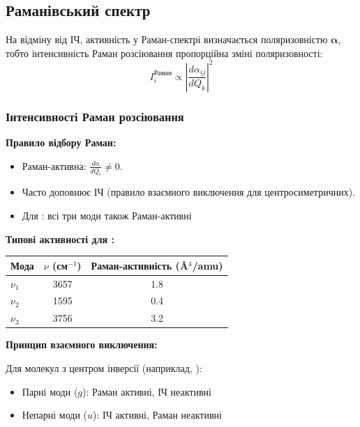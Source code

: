 {%
\subsection{Раманівський спектр}

На відміну від ІЧ, активність у Раман-спектрі визначається
поляризовністю $\boldsymbol{\alpha}$, тобто інтенсивність Раман розсіювання пропорційна зміні поляризовності:
\[
    I_i^{\text{Раман}} \propto \left|\frac{d\alpha_{ij}}{dQ_k}\right|^2
\]

\subsubsection{Інтенсивності Раман розсіювання}


\textbf{Правило відбору Раман:}
\begin{itemize}
    \item Раман-активна: $\frac{d\alpha}{dQ_i} \neq 0$.
    \item Часто доповнює ІЧ (правило взаємного виключення для центросиметричних).
    \item Для : всі три моди також Раман-активні
\end{itemize}


\textbf{Типові активності для :}
\begin{center}
    \begin{tabular}{lcc}
        \toprule
        Мода    & $\nu$ (см$^{-1}$) & Раман-активність (Å$^4$/amu) \\
        \midrule
        $\nu_1$ & 3657              & 1.8                          \\
        $\nu_2$ & 1595              & 0.4                          \\
        $\nu_3$ & 3756              & 3.2                          \\
        \bottomrule
    \end{tabular}
\end{center}


\textbf{Принцип взаємного виключення:}

Для молекул з центром інверсії (наприклад, ):
\begin{itemize}
    \item Парні моди ($g$): Раман активні, ІЧ неактивні
    \item Непарні моди ($u$): ІЧ активні, Раман неактивні
\end{itemize}

}
